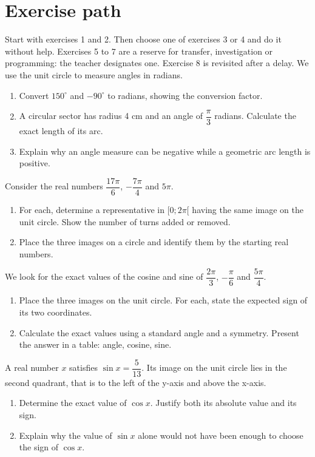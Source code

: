 \section*{Exercise path}\label{C10-PARC}
Start with exercises 1 and 2. Then choose one of exercises 3 or 4 and do it without help. Exercises 5 to 7 are a reserve for transfer, investigation or programming: the teacher designates one. Exercise 8 is revisited after a delay.
\begingroup
{}
We use the unit circle to measure angles in radians.
\begin{enumerate}[label=\arabic*.]
\item Convert $150^\circ$ and $-90^\circ$ to radians, showing the conversion factor.
\item A circular sector has radius 4 cm and an angle of $\dfrac\pi3$ radians. Calculate the exact length of its arc.
\item Explain why an angle measure can be negative while a geometric arc length is positive.
\end{enumerate}
Consider the real numbers $\dfrac{17\pi}{6}$, $-\dfrac{7\pi}{4}$ and $5\pi$.
\begin{enumerate}[label=\arabic*.]
\item For each, determine a representative in $[0;2\pi[$ having the same image on the unit circle. Show the number of turns added or removed.
\item Place the three images on a circle and identify them by the starting real numbers.
\end{enumerate}
We look for the exact values of the cosine and sine of $\dfrac{2\pi}{3}$, $-\dfrac\pi6$ and $\dfrac{5\pi}{4}$.
\begin{enumerate}[label=\arabic*.]
\item Place the three images on the unit circle. For each, state the expected sign of its two coordinates.
\item Calculate the exact values using a standard angle and a symmetry. Present the answer in a table: angle, cosine, sine.
\end{enumerate}
A real number $x$ satisfies $\sin x=\dfrac5{13}$. Its image on the unit circle lies in the second quadrant, that is to the left of the y-axis and above the x-axis.
\begin{enumerate}[label=\arabic*.]
\item Determine the exact value of $\cos x$. Justify both its absolute value and its sign.
\item Explain why the value of $\sin x$ alone would not have been enough to choose the sign of $\cos x$.
\end{enumerate}
